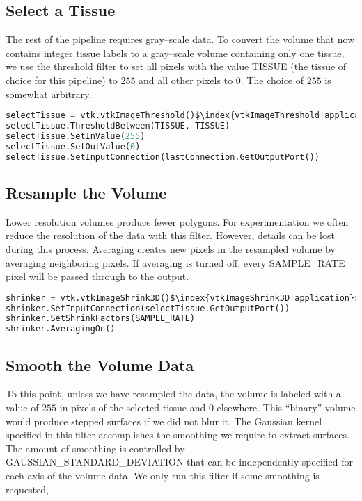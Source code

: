 \subsection{Select a Tissue}

\noindent The rest of the pipeline requires gray--scale data. To convert the volume that now contains integer tissue labels to a gray--scale volume containing only one tissue, we use the threshold filter to set all pixels with the value TISSUE (the tissue of choice for this pipeline) to $255$ and all other pixels to $0$. The choice of $255$ is somewhat arbitrary.

\begin{lstlisting}[language=Python, caption={Select a Tissue.}, escapechar=\$]
selectTissue = vtk.vtkImageThreshold()$\index{vtkImageThreshold!application}$
selectTissue.ThresholdBetween(TISSUE, TISSUE)
selectTissue.SetInValue(255)
selectTissue.SetOutValue(0)
selectTissue.SetInputConnection(lastConnection.GetOutputPort())
\end{lstlisting}

\subsection{Resample the Volume}

Lower resolution volumes produce fewer polygons. For experimentation we often reduce the resolution of the data with this filter. However, details can be lost during this process. Averaging creates new pixels in the resampled volume by averaging neighboring pixels. If averaging is turned off, every SAMPLE\_RATE pixel will be passed through to the output.

\begin{lstlisting}[language=Python, caption={Resample the Volume.}, escapechar=\$]
shrinker = vtk.vtkImageShrink3D()$\index{vtkImageShrink3D!application}$
shrinker.SetInputConnection(selectTissue.GetOutputPort())
shrinker.SetShrinkFactors(SAMPLE_RATE)
shrinker.AveragingOn()
\end{lstlisting}

\subsection{Smooth the Volume Data}

To this point, unless we have resampled the data, the volume is labeled with a value of $255$ in pixels of the selected tissue and $0$ elsewhere. This ``binary'' volume would produce stepped surfaces if we did not blur it. The Gaussian kernel specified in this filter accomplishes the smoothing we require to extract surfaces. The amount of smoothing is controlled by  GAUSSIAN\_STANDARD\_DEVIATION that can be independently specified for each axis of the volume data. We only run this filter if some smoothing is requested,

